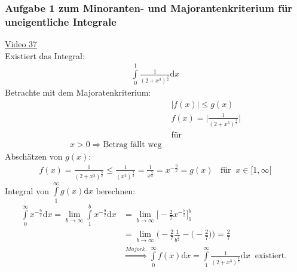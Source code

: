 \subsubsection{Aufgabe 1 zum Minoranten- und Majorantenkriterium für uneigentliche Integrale}
\href{https://youtu.be/xJGJ5_nopx0}{Video 37}\\
Existiert das Integral:\\
\begin{align*}
\int\limits_{0}^{1} \frac{1}{(2+x^3)^{\frac{3}{2}}}\mathrm{d}x
\end{align*}
Betrachte mit dem Majoratenkriterium:\\
\begin{align*}
&\lvert f(x)\lvert\leq g(x) \\
&f(x)=\bigg|\frac{1}{(2+x^3)^{\frac{3}{2}}}\bigg|\\
&\text{für }\\x>0\Rightarrow \text{Betrag fällt weg }
\end{align*}
Abschätzen von $ g(x) $:\\
\begin{align*}
f(x)=\frac{1}{(2+x^3)^{\frac{3}{2}}}\leq \frac{1}{(x^3)^{\frac{3}{2}}}=\frac{1}{x^{\frac{9}{2}}}=x^{-\frac{9}{2}}=g(x)\;\;\text{ für}\;\;x\in[1,\infty[
\end{align*}
Integral von $\int\limits_{1}^{\infty}  g(x)\mathrm{d}x $ berechnen:\\
\begin{align*}
\int\limits_{0}^{\infty} x^{-\frac{9}{2}}\mathrm{d}x=\lim\limits_ {b\to\infty}\int\limits_{1}^{b} x^{-\frac{9}{2}}\mathrm{d}x&=\lim\limits_ {b\to\infty}\bigg[-\frac{2}{7}x^{-\frac{7}{2}}\bigg]^b_1\\
&=\lim\limits_ {b\to\infty}\bigg(-\frac{2}{7}\frac{1}{b^{\frac{7}{2}}}-\big(-\frac{2}{7}\big)\bigg)=\frac{2}{7}\\
&\overset{Majork.}{\Rightarrow}\int\limits_{0}^{\infty} f(x)\mathrm{d}x=\int\limits_{1}^{\infty} \frac{1}{(2+x^3)^{\frac{3}{2}}}\mathrm{d}x\;\;\text{existiert. }
\end{align*}
